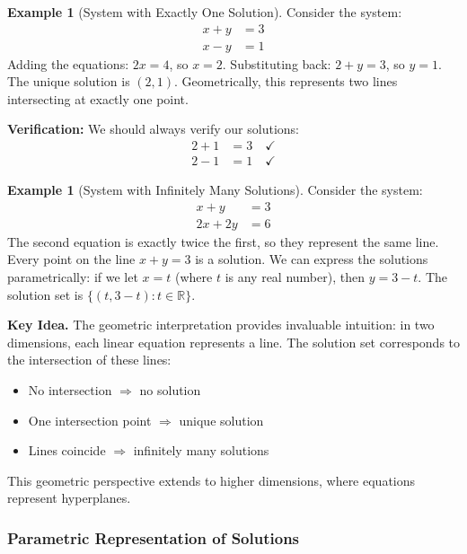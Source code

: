 \documentclass[12pt]{article}
\numberwithin{equation}{section}
\newcommand{\RR}{\mathbb{R}}
\theoremstyle{plain}
\theoremstyle{definition}
\newtheorem{example}[theorem]{Example}
\theoremstyle{remark}
\newenvironment{keyidea}{\begin{tcolorbox}\textbf{Key Idea.}}{\end{tcolorbox}}
\begin{document}
\begin{example}[System with Exactly One Solution]
Consider the system:
\begin{align}
x + y &= 3\\
x - y &= 1
\end{align}
Adding the equations: $2x = 4$, so $x = 2$.
Substituting back: $2 + y = 3$, so $y = 1$.
The unique solution is $(2, 1)$. Geometrically, this represents two lines intersecting at exactly one point.

\textbf{Verification:} We should always verify our solutions:
\begin{align}
2 + 1 &= 3 \quad \checkmark\\
2 - 1 &= 1 \quad \checkmark
\end{align}
\end{example}

\begin{example}[System with Infinitely Many Solutions]
Consider the system:
\begin{align}
x + y &= 3\\
2x + 2y &= 6
\end{align}
The second equation is exactly twice the first, so they represent the same line. Every point on the line $x + y = 3$ is a solution. We can express the solutions parametrically: if we let $x = t$ (where $t$ is any real number), then $y = 3 - t$. The solution set is $\{(t, 3-t) : t \in \RR\}$.
\end{example}

\begin{keyidea}
The geometric interpretation provides invaluable intuition: in two dimensions, each linear equation represents a line. The solution set corresponds to the intersection of these lines:
\begin{itemize}
\item No intersection $\Rightarrow$ no solution
\item One intersection point $\Rightarrow$ unique solution  
\item Lines coincide $\Rightarrow$ infinitely many solutions
\end{itemize}
This geometric perspective extends to higher dimensions, where equations represent hyperplanes.
\end{keyidea}

\subsubsection{Parametric Representation of Solutions}
\end{document}
